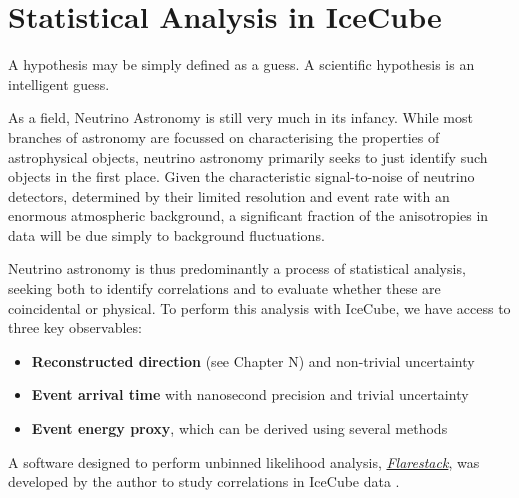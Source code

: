 \setchapterpreamble[u]{\margintoc}
\chapter{Statistical Analysis in IceCube}
\begin{fquote} A hypothesis may be simply defined as a guess. A scientific hypothesis is an intelligent guess. 
\end{fquote}

As a field, Neutrino Astronomy is still very much in its infancy. While most branches of astronomy are focussed on characterising the properties of astrophysical objects, neutrino astronomy primarily seeks to just identify such objects in the first place. Given the characteristic signal-to-noise of neutrino detectors, determined by their limited resolution and event rate with an enormous atmospheric background, a significant fraction of the anisotropies in data will be due simply to background fluctuations.

Neutrino astronomy is thus predominantly a process of statistical analysis, seeking both to identify correlations and to evaluate whether these are coincidental or physical. To perform this analysis with IceCube, we have access to three key observables:

\begin{itemize}
	\item \textbf{Reconstructed direction} (see Chapter N) and non-trivial uncertainty 
	\item \textbf{Event arrival time} with nanosecond precision and trivial uncertainty
	\item \textbf{Event energy proxy}, which can be derived using several methods 
\end{itemize}

A software designed to perform unbinned likelihood analysis, \emph{\href{https://github.com/IceCubeOpenSource/flarestack}{Flarestack}}, was developed by the author to study correlations in IceCube data .

